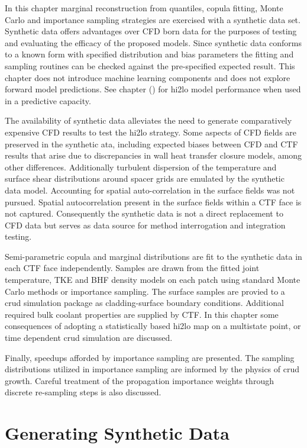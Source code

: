 
In this chapter marginal reconstruction from quantiles, copula fitting, Monte Carlo and importance sampling strategies are exercised with a synthetic data set.  Synthetic data offers advantages over CFD born data for the purposes of testing and evaluating the efficacy of the proposed models.  Since synthetic data conforms to a known form with specified distribution and bias parameters the fitting and sampling routines can be checked against the pre-specified expected result.
This chapter does not introduce machine learning components and does not explore forward model predictions.  See chapter () for hi2lo model performance when used in a predictive capacity.

The availability of synthetic data alleviates the need to generate comparatively expensive CFD results to test the hi2lo strategy.  Some aspects of CFD fields are preserved in the synthetic ata, including expected biases between CFD and CTF results that arise due to discrepancies in wall heat transfer closure models, among other differences. Additionally turbulent dispersion of the temperature and surface shear distributions around spacer grids are emulated by the synthetic data model.  Accounting for spatial auto-correlation in the surface fields was not pursued.  Spatial autocorrelation present in the surface fields within a CTF face is not captured.  Consequently the synthetic data is not a direct replacement to CFD data but serves as data source for method interrogation and integration testing.

Semi-parametric copula and marginal distributions are fit to the synthetic data in each CTF face independently.  Samples are drawn from the fitted joint temperature, TKE and BHF density models on each patch using standard Monte Carlo methods or importance sampling.  The surface samples are provied to a crud simulation package as cladding-surface boundary conditions.  Additional required bulk coolant properties are supplied by CTF.
In this chapter some consequences of adopting a statistically based hi2lo map  on a multistate point, or time dependent crud simulation are discussed.

Finally, speedups afforded by importance sampling are presented.  The sampling distributions utilized in importance sampling are informed by the physics of crud growth. Careful treatment of the propagation importance weights through discrete re-sampling steps is also discussed.

\section{Generating Synthetic Data}

